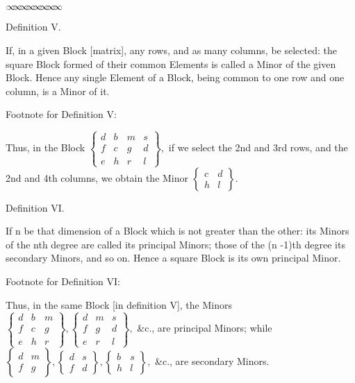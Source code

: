 \documentclass[11pt]{article}%
\theoremstyle{definition}
\newcommand{\sep}{\vspace{-3pt} \begin{center}
{\mathversion{normal}
$\infty \mspace{-5.5mu} \infty \mspace{-5.5mu}
\infty \mspace{-5.5mu} \infty \mspace{-5.5mu}
\infty \mspace{-5.5mu} \infty \mspace{-5.5mu}
\infty \mspace{-5.5mu} \infty$}
\end{center} \vspace{-3pt}}
\begin{document}
\sep


\begin{center}
\textsf{Definition V.}
\end{center}

\textsf{If, in a given Block [matrix], any rows, and as many columns, be
selected: the square Block formed of their common Elements is called a Minor
of the given Block. Hence any single Element of a Block, being common to one
row and one column, is a Minor of it.}

\textsf{Footnote for Definition V:}

\textsf{Thus, in the Block }$%
\begin{Bmatrix}
d & b & m & s\\
f & c & g & d\\
e & h & r & l
\end{Bmatrix}
,$ \textsf{if we select the 2nd and 3rd rows, and the 2nd and 4th columns, we
obtain the Minor }$%
\begin{Bmatrix}
c & d\\
h & l
\end{Bmatrix}
.$

\begin{center}
\textsf{Definition VI.}
\end{center}

\textsf{If n be that dimension of a Block which is not greater than the other:
its Minors of the nth degree are called its principal Minors; those of the (n
-1)th degree its secondary Minors, and so on. Hence a square Block is its own
principal Minor.}

\textsf{Footnote for Definition VI:}

\textsf{Thus, in the same Block [in definition V], the Minors }$%
\begin{Bmatrix}
d & b & m\\
f & c & g\\
e & h & r
\end{Bmatrix}
,%
\begin{Bmatrix}
d & m & s\\
f & g & d\\
e & r & l
\end{Bmatrix}
,$ \textsf{\&c.}, \textsf{are principal Minors; while }$%
\begin{Bmatrix}
d & m\\
f & g
\end{Bmatrix}
,%
\begin{Bmatrix}
d & s\\
f & d
\end{Bmatrix}
,%
\begin{Bmatrix}
b & s\\
h & l
\end{Bmatrix}
,$ \textsf{\&c}., \textsf{are secondary Minors.}
\end{document}
